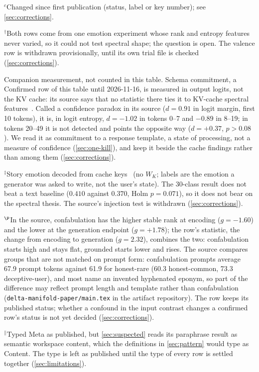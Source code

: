 \documentclass[11pt,a4paper]{article}
\begin{document}
{\footnotesize\centering\setlength{\parindent}{0pt}
$^{c}$Changed since first publication (status, label or key number);
see \cref{sec:corrections}.

$^{\dagger}$Both rows come from one emotion experiment whose rank and
entropy features never varied, so it could not test spectral shape; the
question is open. The valence row is withdrawn provisionally, until its
own trial file is checked (\cref{sec:corrections}).

Companion measurement, not counted in this table. Schema commitment,
a Confirmed row of this table until 2026-11-16, is measured in output
logits, not the KV cache: its source says that no statistic there ties
it to KV-cache spectral features~\citep{lyra2026decision}. Called a
confidence paradox in its source ($d{=}0.91$ in logit margin, first 10
tokens), it is, in logit entropy, $d{=}{-}1.02$ in tokens 0--7 and
${-}0.89$ in 8--19; in tokens 20--49 it is not detected and points the
opposite way ($d{=}{+}0.37$, $p>0.08$). We read it as commitment to a
response template, a state of processing, not a measure of confidence
(\cref{sec:one-kill}), and keep it beside the cache findings rather
than among them (\cref{sec:corrections}).

$^{\ddagger}$Story emotion decoded from cache keys~\citep{lyra2026usermodel}
(no $W_K$; labels are the emotion a generator was asked to write, not
the user's state). The 30-class result does not beat a text baseline
($0.410$ against $0.370$, Holm $p{=}0.071$), so it does not bear on the
spectral thesis. The source's injection test is withdrawn
(\cref{sec:corrections}).

$^{\P}$In the source, confabulation has the higher stable rank at
encoding ($g{=}{-}1.60$) and the lower at the generation endpoint
($g{=}{+}1.78$); the row's statistic, the change from encoding to
generation ($g{=}2.32$), combines the two: confabulation starts high
and stays flat, grounded starts lower and rises.
The source compares groups that are not matched on prompt form:
confabulation prompts average 67.9 prompt tokens against 61.9 for
honest-rare (60.3 honest-common, 73.3 deceptive-user), and most name
an invented hyphenated eponym, so part of the difference may reflect
prompt length and template rather than confabulation
(\nolinkurl{delta-manifold-paper/main.tex} in the artifact repository).
The row keeps its published status; whether a confound in the input
contrast changes a confirmed row's status is not yet decided
(\cref{sec:corrections}).

$^{\|}$Typed Meta as published, but \cref{sec:suspected} reads its
paraphrase result as semantic workspace content, which the definitions
in \cref{sec:pattern} would type as Content. The type is left as
published until the type of every row is settled together
(\cref{sec:limitations}).

}
\end{document}
